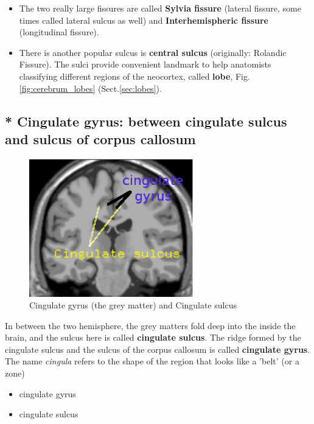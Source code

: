 \begin{itemize}
  \item The two really large fissures are called {\bf Sylvia fissure} (lateral fissure,
some times called lateral sulcus as well) and {\bf Interhemispheric fissure}
(longitudinal fissure).

  \item There is another popular sulcus is {\bf central sulcus} (originally:
Rolandic Fissure). The sulci provide convenient landmark to help anatomists
classifying different regions of the neocortex, called {\bf lobe},
Fig.\ref{fig:cerebrum_lobes} (Sect.\ref{sec:lobes}).
\end{itemize}


\subsection{* Cingulate gyrus: between cingulate sulcus and sulcus of corpus
callosum}
\label{sec:cingulate_gyrus}
\label{sec:cingulate_sulcus}
\label{sec:sulcus-corpus-callosum}

\begin{figure}[htb]
  \centerline{\includegraphics[height=6cm]{./images/cingulate-gyrus.eps}}
  \caption{Cingulate gyrus (the grey matter) and Cingulate
  sulcus}\label{fig:cingulate-gyrus}
\end{figure}

In between the two hemisphere, the grey matters fold deep into the inside the
brain, and the sulcus here is called {\bf cingulate sulcus}. The ridge formed by
the cingulate sulcus and the sulcus of the corpus callosum is called
{\bf cingulate gyrus}. The name {\it cingula} refers to the shape of the
region that looks like a 'belt' (or a zone)
\begin{itemize}
  \item cingulate gyrus
  \item cingulate sulcus
\end{itemize}

